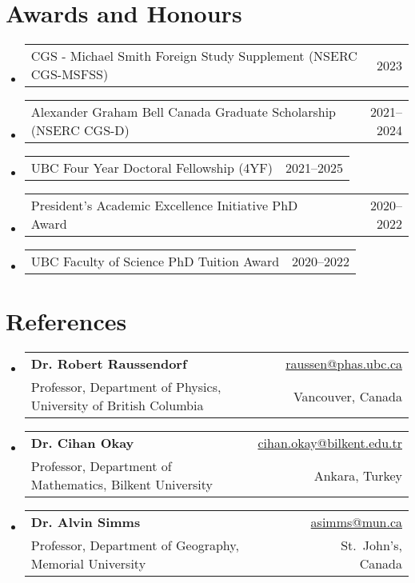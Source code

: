 \documentclass[letterpaper,11pt]{article}
\makeatletter
\newcommand{\AwardsItem}[2]{
	\item{\vspace{-1pt}
		\begin{tabular*}{0.97\textwidth}{l@{\extracolsep{\fill}}r}
			{#1} & {#2}
		\end{tabular*}
		\vspace{-5pt}
	}
}
\newcommand{\ReferencesItem}[4]{
	\item{\vspace{-1pt}
		\begin{tabular*}{0.97\textwidth}{l@{\extracolsep{\fill}}r}
			\textbf{#1} & {#2}\\
			{#3} & {#4}
		\end{tabular*}
		\vspace{-5pt}
	}
}
\makeatother
\begin{document}
\section*{Awards and Honours}
\begin{itemize}[leftmargin=*]
	\AwardsItem{CGS - Michael Smith Foreign Study Supplement (NSERC CGS-MSFSS)}{2023}
	\AwardsItem{Alexander Graham Bell Canada Graduate Scholarship (NSERC CGS-D)}{2021--2024}
	\AwardsItem{UBC Four Year Doctoral Fellowship (4YF)}{2021--2025}
	\AwardsItem{President's Academic Excellence Initiative PhD Award}{2020--2022}
	\AwardsItem{UBC Faculty of Science PhD Tuition Award }{2020--2022}
\end{itemize}


\section*{References}
\begin{itemize}[leftmargin=*]
	\ReferencesItem{Dr. Robert Raussendorf}{\href{mailto:raussen@phas.ubc.ca}{raussen@phas.ubc.ca}}{Professor, Department of Physics, University of British Columbia}{Vancouver, Canada}
	
	\ReferencesItem{Dr. Cihan Okay}{\href{mailto:cihan.okay@bilkent.edu.tr}{cihan.okay@bilkent.edu.tr}}{Professor, Department of Mathematics, Bilkent University}{Ankara, Turkey}
	
	\ReferencesItem{Dr. Alvin Simms}{\href{mailto:asimms@mun.ca}{asimms@mun.ca}}{Professor, Department of Geography, Memorial University}{St.~John's, Canada}
\end{itemize}
\end{document}
